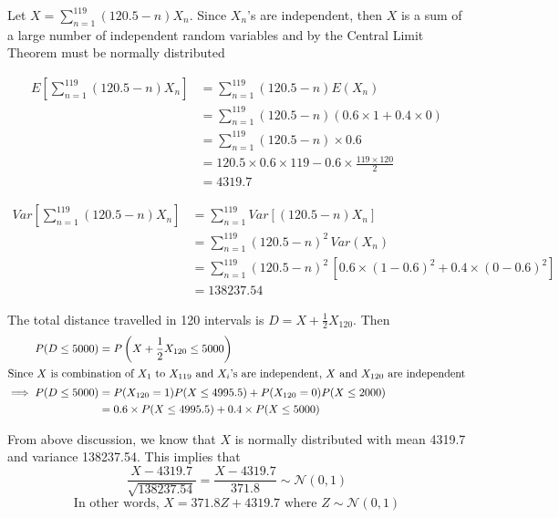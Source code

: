 \documentclass[12pt, oneside]{article}
\begin{document}
\begin{enumerate}
{    Let \(X = \sum_{n = 1}^{119} (120.5 - n) X_n\). Since \(X_n\)'s are independent,
    then \(X\) is a sum of a large number of independent random variables and by the
    Central Limit Theorem must be normally distributed

    \begin{align*}
        E\left[\sum_{n = 1}^{119} (120.5 - n) X_n\right] &= \sum_{n = 1}^{119} (120.5 - n) E(X_n) \\
            &= \sum_{n = 1}^{119} (120.5 - n) (0.6 \times 1 + 0.4 \times 0) \\
            &= \sum_{n = 1}^{119} (120.5 - n) \times 0.6 \\
            &= 120.5 \times 0.6 \times 119 - 0.6 \times \frac{119 \times 120}{2} \\
            &= 4319.7
    \end{align*}

    \begin{align*}
        Var\left[\sum_{n = 1}^{119} (120.5 - n) X_n\right]
            &= \sum_{n = 1}^{119} Var\left[(120.5 - n) X_n\right] \tag*{(As the rv's are independent)} \\
            &= \sum_{n = 1}^{119} (120.5 - n)^2 \, Var(X_n) \\
            &= \sum_{n = 1}^{119} (120.5 - n)^2 \, [0.6 \times (1 - 0.6)^2 + 0.4 \times (0 - 0.6)^2] \\
            &= 138237.54
    \end{align*}

    The total distance travelled in 120 intervals is \(D = X + \frac{1}{2} X_{120}\). Then 
    \begin{align*}
        P(D \leq 5000) &= P\left(X + \frac{1}{2} X_{120} \leq 5000\right) \\
        \intertext{Since \(X\) is combination of \(X_1\) to \(X_{119}\) and \(X_{i}\)'s 
                    are independent, \(X\) and \(X_{120}\) are independent}
        \implies P(D \leq 5000) &= P(X_{120} = 1) P(X \leq 4995.5) + P(X_{120} = 0) P(X \leq 2000) \\
            &= 0.6 \times P(X \leq 4995.5) + 0.4 \times P(X \leq 5000)
    \end{align*}

    From above discussion, we know that \(X\) is normally distributed with mean 4319.7 
    and variance 138237.54. This implies that
    \[\frac{X - 4319.7}{\sqrt{138237.54}} = \frac{X - 4319.7}{371.8} \sim \mathcal{N}(0, 1)\]
    \[\text{In other words, } X = 371.8 Z + 4319.7 \text{ where } Z \sim \mathcal{N}(0, 1)\]

}
\end{enumerate}
\end{document}
